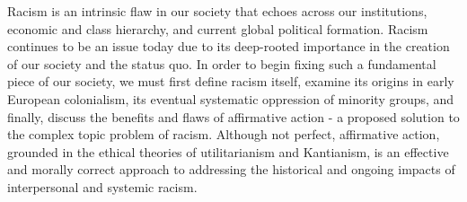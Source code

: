 
Racism is an intrinsic flaw in our society that echoes across our institutions, economic and class hierarchy, and current global political formation. Racism continues to be an issue today due to its deep-rooted importance in the creation of our society and the status quo. In order to begin fixing such a fundamental piece of our society, we must first define racism itself, examine its origins in early European colonialism, its eventual systematic oppression of minority groups, and finally, discuss the benefits and flaws of affirmative action - a proposed solution to the complex topic problem of racism. Although not perfect, affirmative action, grounded in the ethical theories of utilitarianism and Kantianism, is an effective and morally correct approach to addressing the historical and ongoing impacts of interpersonal and systemic racism.


